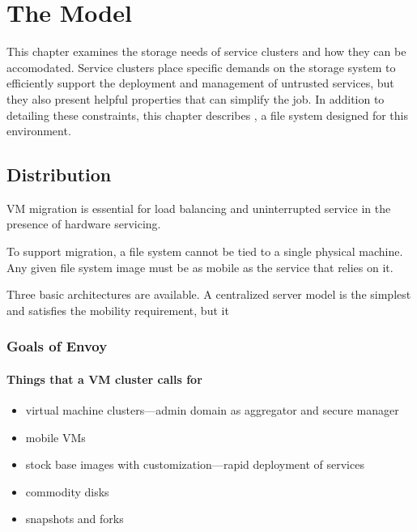 \chapter{The \envoy Model}

This chapter examines the storage needs of service clusters and how they can be accomodated. Service clusters place specific demands on the storage system to efficiently support the deployment and management of untrusted services, but they also present helpful properties that can simplify the job. In addition to detailing these constraints, this chapter describes \envoy, a file system designed for this environment.

\section{Distribution}

VM migration \cite{clark} is essential for load balancing and uninterrupted service in the presence of hardware servicing.

To support migration, a file system cannot be tied to a single physical machine. Any given file system image must be as mobile as the service that relies on it.

Three basic architectures are available. A centralized server model is the simplest and satisfies the mobility requirement, but it 


\subsection{Goals of Envoy}
\subsubsection{Things that a VM cluster calls for}
\begin{itemize}
\item virtual machine clusters---admin domain as aggregator and secure manager
\item mobile VMs
\item stock base images with customization---rapid deployment of services
\item commodity disks
\item snapshots and forks
\end{itemize}

